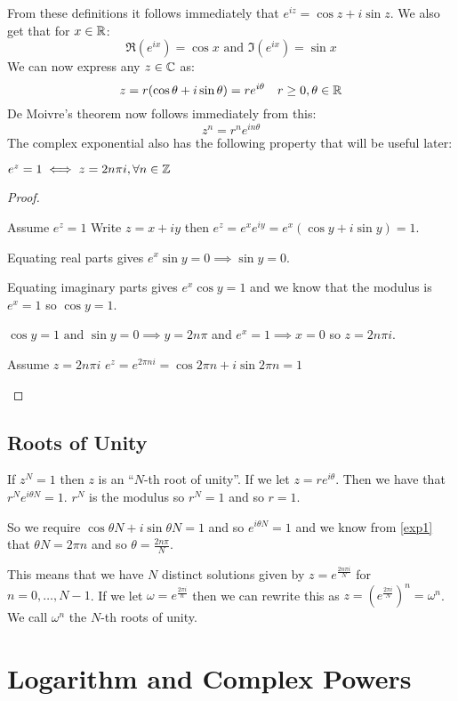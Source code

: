 \documentclass[../main.tex]{subfiles}
\begin{document}
From these definitions it follows immediately that $e^{iz} = \cos z + i\sin z$.
We also get that for $x \in \mathbb{R}$:
\[
  \Re(e^{ix}) = \cos x \text{ and } \Im(e^{ix}) = \sin x
\]
We can now express any $z \in \mathbb{C}$ as:
\[
  z = r(\cos \theta + i\sin\theta) = re^{i\theta}\quad r \geq 0, \theta \in \mathbb{R}
\]
De Moivre's theorem now follows immediately from this:
\[
  z^{n} = r^{n}e^{i n \theta}
\]
The complex exponential also has the following property that will be useful later:
\begin{lemma}
  $e^{z} = 1 \iff z = 2n \pi i, \forall n \in \mathbb{Z}$
  \label{exp1}
\end{lemma}
\begin{proof}
  \begin{proofdirection}{Assume $e^{z} = 1$}
    Write $z = x + iy$ then $e^{z} = e^{x} e^{iy} = e^{x} (\cos y + i \sin y) = 1$.

    Equating real parts gives $e^{x} \sin y = 0 \implies \sin y = 0$.

    Equating imaginary parts gives $e^{x} \cos y = 1$ and we know that the modulus is $e^{x} = 1$ so $\cos y = 1$.

    $\cos y = 1 \text{ and } \sin y = 0 \implies y = 2n\pi$ and $e^{x} = 1 \implies x = 0$ so $z = 2n\pi i$.
  \end{proofdirection}
  \begin{proofdirection}{Assume $z = 2n \pi i$}
    $e^{z} = e^{2 \pi n i} = \cos 2 \pi n + i \sin 2 \pi n = 1$
  \end{proofdirection}
\end{proof}
\subsection{Roots of Unity}
If $z^{N} = 1$ then $z$ is an ``$N$-th root of unity''.
If we let $z = re^{i\theta}$.
Then we have that $r^{N}e^{i \theta N} = 1$.
$r^{N}$ is the modulus so $r^{N} = 1$ and so $r = 1$.

So we require $\cos \theta N + i \sin \theta N = 1$ and so $e^{i \theta N} = 1$ and we know from \cref{exp1} that $\theta N = 2 \pi n$ and so $\theta = \frac{2n \pi}{N}$.

This means that we have $N$ distinct solutions given by $z = e^{\frac{2 n \pi i}{N}}$ for $n = 0, \ldots, N - 1$.
If we let $\omega = e^{\frac{2 \pi i}{n}}$ then we can rewrite this as $z = (e^{\frac{2 \pi i}{N}})^{n} = \omega^{n}$.
We call $\omega^{n}$ the $N$-th roots of unity.
\section{Logarithm and Complex Powers}
\end{document}
